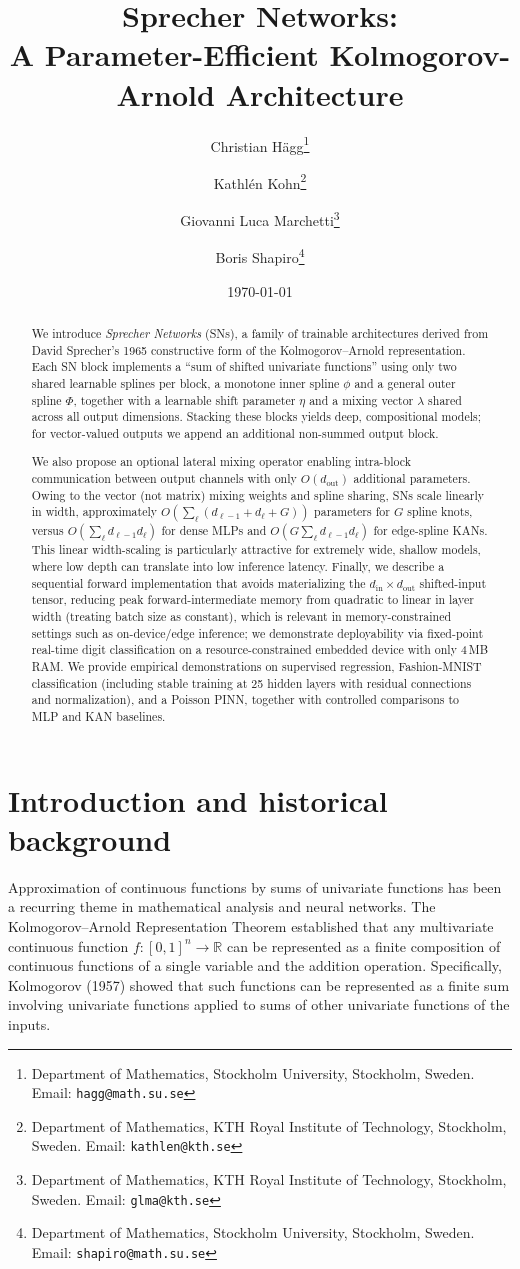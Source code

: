 \documentclass{article}
\title{Sprecher Networks: \\ A Parameter-Efficient Kolmogorov-Arnold Architecture}
\author{
  Christian Hägg\thanks{Department of Mathematics, Stockholm University, Stockholm, Sweden. Email: \texttt{hagg@math.su.se}} \and
  Kathlén Kohn\thanks{Department of Mathematics, KTH Royal Institute of Technology, Stockholm, Sweden. Email: \texttt{kathlen@kth.se}} \and
  Giovanni Luca Marchetti\thanks{Department of Mathematics, KTH Royal Institute of Technology, Stockholm, Sweden. Email: \texttt{glma@kth.se}} \and
  Boris Shapiro\thanks{Department of Mathematics, Stockholm University, Stockholm, Sweden. Email: \texttt{shapiro@math.su.se}}
}
\date{\today}
\theoremstyle{plain}
\theoremstyle{definition}
\theoremstyle{remark}
\begin{document}
\maketitle

\begin{abstract}
We introduce \emph{Sprecher Networks} (SNs), a family of trainable architectures derived from David Sprecher's 1965 constructive form of the Kolmogorov--Arnold representation. Each SN block implements a ``sum of shifted univariate functions'' using only two shared learnable splines per block, a monotone inner spline $\phi$ and a general outer spline $\Phi$, together with a learnable shift parameter $\eta$ and a mixing vector $\lambda$ shared across all output dimensions. Stacking these blocks yields deep, compositional models; for vector-valued outputs we append an additional non-summed output block.

We also propose an optional lateral mixing operator enabling intra-block communication between output channels with only $O(d_{\mathrm{out}})$ additional parameters. Owing to the vector (not matrix) mixing weights and spline sharing, SNs scale linearly in width, approximately $O\!\left(\sum_{\ell}(d_{\ell-1}+d_{\ell}+G)\right)$ parameters for $G$ spline knots, versus $O\!\left(\sum_{\ell} d_{\ell-1}d_{\ell}\right)$ for dense MLPs and $O\!\left(G\sum_{\ell} d_{\ell-1}d_{\ell}\right)$ for edge-spline KANs. This linear width-scaling is particularly attractive for extremely wide, shallow models, where low depth can translate into low inference latency. Finally, we describe a sequential forward implementation that avoids materializing the $d_{\mathrm{in}}\times d_{\mathrm{out}}$ shifted-input tensor, reducing peak forward-intermediate memory from quadratic to linear in layer width (treating batch size as constant), which is relevant in memory-constrained settings such as on-device/edge inference; we demonstrate deployability via fixed-point real-time digit classification on a resource-constrained embedded device with only 4\,MB RAM. We provide empirical demonstrations on supervised regression, Fashion-MNIST classification (including stable training at 25 hidden layers with residual connections and normalization), and a Poisson PINN, together with controlled comparisons to MLP and KAN baselines.
\end{abstract}

\section{Introduction and historical background}
Approximation of continuous functions by sums of univariate functions has been a recurring theme in mathematical analysis and neural networks. The Kolmogorov--Arnold Representation Theorem \cite{kolmogorov, arnold} established that any multivariate continuous function $f : [0,1]^n \to \mathbb{R}$ can be represented as a finite composition of continuous functions of a single variable and the addition operation. Specifically, Kolmogorov (1957) showed that such functions can be represented as a finite sum involving univariate functions applied to sums of other univariate functions of the inputs.
\end{document}
